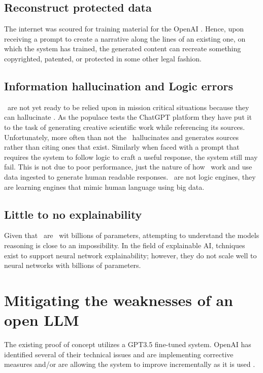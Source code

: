 \subsection{Reconstruct protected data}
The internet was scoured for training material for the OpenAI \gpts. 
Hence, upon receiving a prompt to create a narrative along the lines of an existing one, on which the system has trained, the generated content can recreate something copyrighted, patented, or protected in some other legal fashion.


\subsection{Information hallucination and Logic errors}
\llms\ are not yet ready to be relied upon in mission critical situations because they can hallucinate \cite{OpenAI:2023:gpt4}.
As the populace tests the ChatGPT platform they have put it to the task of generating creative scientific work while referencing its sources.
Unfortunately, more often than not the \gai\ hallucinates and generates sources rather than citing ones that exist.
Similarly when faced with a prompt that requires the system to follow logic to craft a useful response, the system still may fail.
This is not due to poor performance, just the nature of how \llms\ work and use data ingested to generate human readable responses.
\llms\ are not logic engines, they are learning engines that mimic human language using big data.

 
\subsection{Little to no explainability}
Given that \gpts\ are \llms\ wit billions of parameters, attempting to understand the models reasoning is close to an impossibility.
In the field of explainable AI, tchniques exist to support neural network explainability; however, they do not scale well to neural networks with billions of parameters.


\section{Mitigating the weaknesses of an open LLM}
The existing proof of concept utilizes a GPT3.5 fine-tuned system.
OpenAI has identified several of their technical issues and are implementing corrective measures and/or are allowing the system to improve incrementally as it is used \cite{OpenAI:2023:gpt4}.

